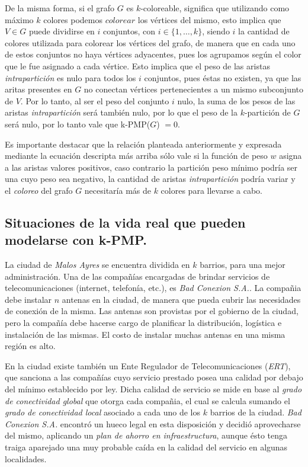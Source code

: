 De la misma forma, si el grafo $G$ es $k$-coloreable, significa que utilizando
como máximo $k$ colores podemos $colorear$ los vértices del mismo, esto implica
que $V \in G$ puede dividirse en $i$ conjuntos, con $i \in \{1, \dots, k\}$, siendo $i$ la cantidad de colores utilizada para colorear los vértices del grafo, de manera que en cada uno de estos conjuntos no haya vértices adyacentes, pues los agrupamos según el color que le fue asignado a cada vértice. Esto implica que el peso de las aristas \textit{intrapartición} es nulo para todos los $i$ conjuntos, pues éstas no existen, ya que las aritas presentes en $G$ no conectan vértices pertenecientes a un mismo subconjunto de $V$. Por lo tanto, al ser el peso del conjunto $i$ nulo, la suma de los pesos de las aristas \textit{intrapartición} será también nulo, por lo que el peso de la $k$-partición de $G$ será nulo, por lo tanto vale que k-PMP($G$) $= 0$.

Es importante destacar que la relación planteada anteriormente y expresada mediante la ecuación descripta más arriba sólo vale si la función de peso $w$ asigna a las aristas valores positivos, caso contrario la partición peso mínimo podría ser una cuyo peso sea negativo, la cantidad de aristas \textit{intrapartición} podría variar y el \textit{coloreo} del grafo $G$ necesitaría más de $k$ colores para llevarse a cabo.



\newpage
\subsection{Situaciones de la vida real que pueden modelarse con k-PMP.}
\vspace*{0.3cm}

La ciudad de \textit{Malos Ayres} se encuentra dividida en $k$ barrios, para una mejor administración. Una de las compañías encargadas de brindar servicios de telecomunicaciones (internet, telefonía, etc.), es \textit{Bad Conexion S.A.}.
La compañia debe instalar $n$ antenas en la ciudad, de manera que pueda cubrir las necesidades de conexión de la misma. Las antenas son provistas por el gobierno de la ciudad, pero la compañía debe hacerse cargo de planificar la distribución, logística e instalación de las mismas. El costo de instalar muchas antenas en una misma región es alto.

En la ciudad existe también un Ente Regulador de Telecomunicaciones (\textit{ERT}), que sanciona a las compañías cuyo servicio prestado posea una calidad por debajo del mínimo establecido por ley. Dicha calidad de servicio se mide en base al \textit{grado de conectividad global} que otorga cada compañia, el cual se calcula sumando el \textit{grado de conectividad local} asociado a cada uno de los $k$ barrios de la ciudad. \textit{Bad Conexion S.A.} encontró un hueco legal en esta disposición y decidió aprovecharse del mismo, aplicando un \textit{plan de ahorro en infraestructura}, aunque ésto tenga traiga aparejado una muy probable caída en la calidad del servicio en algunas localidades.

